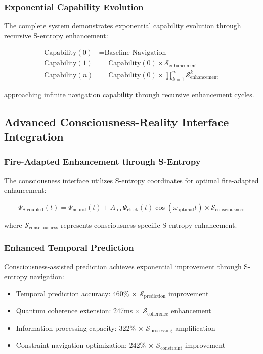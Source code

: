 \documentclass[12pt,a4paper]{article}
\begin{document}
{{{{{{{{{{{{{{\subsubsection{Exponential Capability Evolution}

The complete system demonstrates exponential capability evolution through recursive S-entropy enhancement:

\begin{align}
\text{Capability}(0) &= \text{Baseline Navigation} \\
\text{Capability}(1) &= \text{Capability}(0) \times \mathcal{S}_{\text{enhancement}} \\
\text{Capability}(n) &= \text{Capability}(0) \times \prod_{k=1}^{n} \mathcal{S}_{\text{enhancement}}^k
\end{align}

approaching infinite navigation capability through recursive enhancement cycles.

\subsection{Advanced Consciousness-Reality Interface Integration}

\subsubsection{Fire-Adapted Enhancement through S-Entropy}

The consciousness interface utilizes S-entropy coordinates for optimal fire-adapted enhancement:

\begin{equation}
\Psi_{\text{S-coupled}}(t) = \Psi_{\text{neural}}(t) + A_{\text{fire}} \Psi_{\text{clock}}(t) \cos(\omega_{\text{optimal}} t) \times \mathcal{S}_{\text{consciousness}}
\end{equation}

where $\mathcal{S}_{\text{consciousness}}$ represents consciousness-specific S-entropy enhancement.

\subsubsection{Enhanced Temporal Prediction}

Consciousness-assisted prediction achieves exponential improvement through S-entropy navigation:

\begin{itemize}
\item Temporal prediction accuracy: 460\% × $\mathcal{S}_{\text{prediction}}$ improvement
\item Quantum coherence extension: 247ms × $\mathcal{S}_{\text{coherence}}$ enhancement
\item Information processing capacity: 322\% × $\mathcal{S}_{\text{processing}}$ amplification
\item Constraint navigation optimization: 242\% × $\mathcal{S}_{\text{constraint}}$ improvement
\end{itemize}

}}}}}}}}}}}}}}
\end{document}
